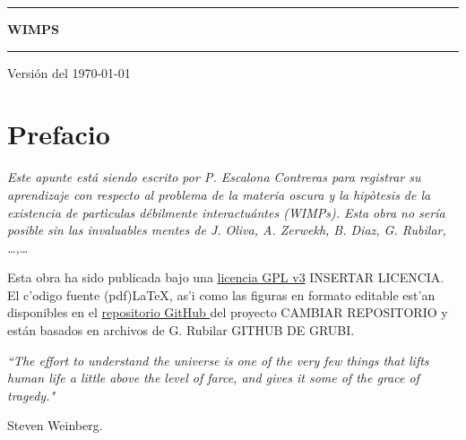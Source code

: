 \documentclass[letterpaper,11pt]{report}
\begin{document}
\sffamily

\thispagestyle{empty}
\begin{center}



\vspace{6.5cm}

\rule{15cm}{0.1cm}

\vspace{1.5cm}

{\huge \textsc{\textbf{WIMPS}}}

\vspace{1.5cm}

\rule{15cm}{0.1cm}

\vspace{1.5cm}

Versión del \today

\end{center}

\newpage
\thispagestyle{empty}
\newpage
\setcounter{page}{1}

\pagestyle{plain}
\chapter*{Prefacio}
\bigskip
\bigskip
\bigskip
\bigskip
\bigskip
\bigskip


\emph{Este apunte está siendo escrito por P. Escalona Contreras para registrar su aprendizaje con respecto al \textit{problema de la materia oscura} y la hipòtesis de la existencia de \textit{partìculas débilmente interactuántes} (WIMPs). Esta obra no sería posible sin las invaluables mentes de J. Oliva, A. Zerwekh, B. Diaz, G. Rubilar,  \dots,\dots}

\bigskip


\bigskip

Esta obra ha sido publicada bajo una \href{https://github.com/gfrubi/electrodinamica/blob/master/LICENSE}{licencia GPL v3} INSERTAR LICENCIA. El c'odigo fuente (pdf)\LaTeX, as'i como las figuras en formato editable est'an disponibles en el \href{https://github.com/gfrubi/electrodinamica}{repositorio GitHub }del proyecto CAMBIAR REPOSITORIO y están basados en archivos de G. Rubilar GITHUB DE GRUBI.
\bigskip
\bigskip
\bigskip
\bigskip
\bigskip
\bigskip



\emph{\textquotedblleft The effort to understand the universe is one of the very few things that lifts human life a little above the level of farce, and gives it some of the grace of tragedy."}

\begin{flushright}
Steven Weinberg.
\end{flushright}

\newpage

\tableofcontents
{}
\setcounter{page}{1}









\end{document}
